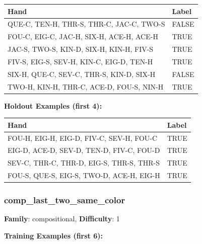 \documentclass[10pt,a4paper]{article}
\begin{document}
\begin{small}
\begin{tabular}{p{8cm}l}
\toprule
Hand & Label \\
\midrule
QUE-C, TEN-H, THR-S, THR-C, JAC-C, TWO-S & \textcolor{negative}{FALSE} \\
FOU-C, EIG-C, JAC-H, SIX-H, ACE-H, ACE-H & \textcolor{positive}{TRUE} \\
JAC-S, TWO-S, KIN-D, SIX-H, KIN-H, FIV-S & \textcolor{positive}{TRUE} \\
FIV-S, EIG-S, SEV-H, KIN-C, EIG-D, TEN-H & \textcolor{positive}{TRUE} \\
SIX-H, QUE-C, SEV-C, THR-S, KIN-D, SIX-H & \textcolor{negative}{FALSE} \\
TWO-H, KIN-H, THR-C, ACE-D, FOU-S, NIN-H & \textcolor{positive}{TRUE} \\
\bottomrule
\end{tabular}
\end{small}

\textbf{Holdout Examples (first 4):}

\begin{small}
\begin{tabular}{p{8cm}l}
\toprule
Hand & Label \\
\midrule
FOU-H, EIG-H, EIG-D, FIV-C, SEV-H, FOU-C & \textcolor{positive}{TRUE} \\
EIG-D, ACE-D, SEV-D, TEN-D, FIV-C, FOU-D & \textcolor{positive}{TRUE} \\
SEV-C, THR-C, THR-D, EIG-S, THR-S, THR-S & \textcolor{positive}{TRUE} \\
FOU-S, QUE-S, EIG-S, TWO-D, ACE-H, EIG-H & \textcolor{positive}{TRUE} \\
\bottomrule
\end{tabular}
\end{small}

\vspace{0.5cm}

\subsubsection{comp\_last\_two\_same\_color}

\textbf{Family}: compositional, \textbf{Difficulty}: 1

\textbf{Training Examples (first 6):}
\end{document}
